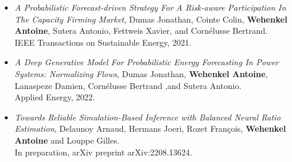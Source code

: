 \begin{itemize}
\item[] \citep{dumas2021probabilistic} \textit{A Probabilistic Forecast-driven Strategy For A Risk-aware Participation In The Capacity Firming Market},
Dumas Jonathan, Cointe Colin, \textbf{Wehenkel Antoine}, Sutera Antonio, Fettweis Xavier, and Corn{\'e}lusse Bertrand.\\
IEEE Transactions on Sustainable Energy, 2021.

\item[] \citep{dumas2022deep} \textit{A Deep Generative Model For Probabilistic Energy Forecasting In Power Systems: Normalizing Flows},
Dumas Jonathan, \textbf{Wehenkel Antoine}, Lanaspeze Damien, Corn{\'e}lusse Bertrand ,and Sutera Antonio.\\
Applied Energy, 2022.

\item[] \citep{delaunoy2022towards} \textit{Towards Reliable Simulation-Based Inference with Balanced Neural Ratio Estimation},
Delaunoy Arnaud, Hermans Joeri, Rozet Fran{\c{c}}ois,  \textbf{Wehenkel Antoine} and Louppe Gilles.\\
In preparation, arXiv preprint arXiv:2208.13624.
\end{itemize}
